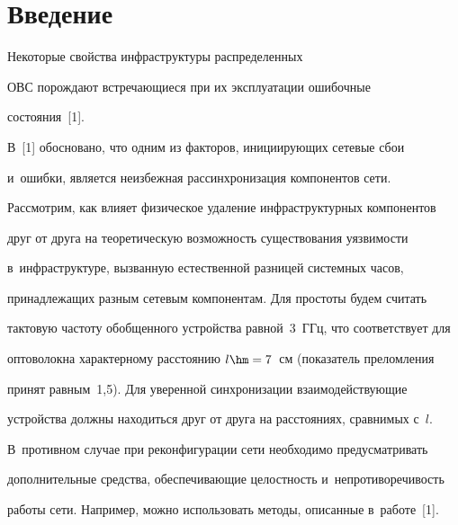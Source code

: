       \thispagestyle{headings}


      


      \vspace*{-18pt} 





\section{Введение}





\vspace*{-6pt}





Некоторые свойства инфраструктуры распределенных 


ОВС порождают встречающиеся при их эксплуатации ошибочные 


состояния~[1]. 





  В~[1] обосновано, что одним из факторов, инициирующих сетевые сбои 


и~ошибки, является неизбежная рассинхронизация компонентов сети. 


Рас\-смот\-рим, как влияет физическое удаление инфраструктурных компонентов 


друг от друга на теоретическую возможность существования уязвимости 


в~инфраструктуре, вызванную естественной разницей системных часов, 


принадлежащих разным сетевым компонентам. Для простоты будем считать 


тактовую частоту обобщенного устройства равной~3~ГГц, что соответствует для 


оптоволокна характерному расстоянию $l\hm = 7$~см (показатель преломления 


принят равным~1,5). Для уверенной синхронизации взаимодействующие 


устройства должны находиться друг от друга на расстояниях, сравнимых с~$l$. 


В~противном случае при реконфигурации сети необходимо предусматривать 


дополнительные средства, обеспечивающие целостность и~непротиворечивость 


работы сети. Например, можно использовать методы, описанные в~работе~[1]. 





